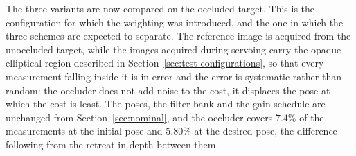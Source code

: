 The three variants are now compared on the occluded target. This is the
configuration for which the weighting was introduced, and the one in which the
three schemes are expected to separate. The reference image is acquired from
the unoccluded target, while the images acquired during servoing carry the
opaque elliptical region described in Section~\ref{sec:test-configurations},
so that every measurement falling inside it is in error and the error is
systematic rather than random: the occluder does not add noise to the cost, it
displaces the pose at which the cost is least. The poses, the filter bank and
the gain schedule are unchanged from Section~\ref{sec:nominal}, and the
occluder covers $7.4\%$ of the measurements at the initial pose and $5.80\%$
at the desired pose, the difference following from the retreat in depth
between them.

